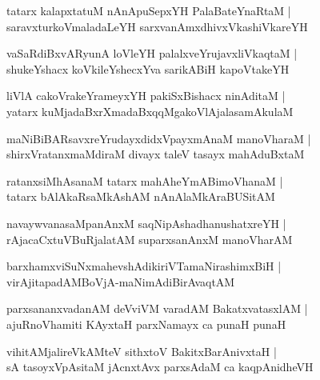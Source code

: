 \documentclass[twoside,12pt,openright]{book}
\newcounter{shloka}[chapter]
\begin{document}
\begin{shloka}%
tatarx kalapxtatuM nAnApuSepxYH PalaBateYnaRtaM |\\
saravxturkoVmaladaLeYH sarxvanAmxdhivxVkashiVkareYH
\end{shloka}

\begin{shloka}%
vaSaRdiBxvARyunA loVleYH palalxveYrujavxliVkaqtaM |\\
shukeYshacx koVkileYshecxYva sarikABiH kapoVtakeYH 
\end{shloka}

\begin{shloka}%
liVlA cakoVrakeYrameyxYH pakiSxBishacx ninAditaM |\\
yatarx kuMjadaBxrXmadaBxqqMgakoVlAjalasamAkulaM 
\end{shloka}

\begin{shloka}%
maNiBiBARsavxreYrudayxdidxVpayxmAnaM manoVharaM |\\
shirxVratanxmaMdiraM divayx taleV tasayx mahAduBxtaM 
\end{shloka}

\begin{shloka}%
ratanxsiMhAsanaM tatarx mahAheYmABimoVhanaM |\\
tatarx bAlAkaRsaMkAshAM nAnAlaMkAraBUSitAM 
\end{shloka}

\begin{shloka}%
navaywvanasaMpanAnxM saqNipAshadhanushatxreYH |\\
rAjacaCxtuVBuRjalatAM suparxsanAnxM manoVharAM 
\end{shloka}

\begin{shloka}%
barxhamxviSuNxmahevshAdikiriVTamaNirashimxBiH |\\
virAjitapadAMBoVjA-maNimAdiBirAvaqtAM 
\end{shloka}

\begin{shloka}%
parxsananxvadanAM deVviVM varadAM BakatxvatasxlAM |\\
ajuRnoVhamiti KAyxtaH parxNamayx ca punaH punaH
\end{shloka}

\begin{shloka}%
vihitAMjalireVkAMteV sithxtoV BakitxBarAnivxtaH |\\
sA tasoyxVpAsitaM jAcnxtAvx parxsAdaM ca kaqpAnidheVH 
\end{shloka}
\end{document}
